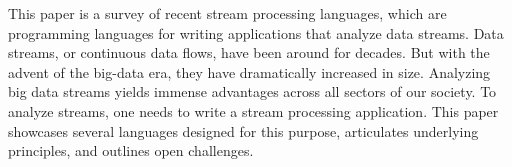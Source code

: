 This paper is a survey of recent stream processing languages, which
are programming languages for writing applications that analyze data
streams. Data streams, or continuous data flows, have been around for
decades. But with the advent of the big-data era, they have
dramatically increased in size. Analyzing big data streams yields
immense advantages across all sectors of our society. To analyze
streams, one needs to write a stream processing application. This
paper showcases several languages designed for this purpose,
articulates underlying principles, and outlines open challenges.
